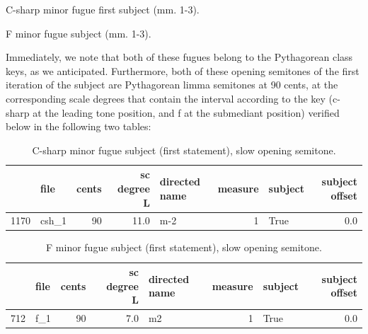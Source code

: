 \begin{Example}[H]
\vspace{1.5em}
    \centering
    \caption{ C-sharp minor fugue first subject (mm. 1-3). }
\end{Example}    


\begin{Example}[H]
\vspace{1.5em}
    \centering
    \caption{ F minor fugue subject (mm. 1-3). }
\end{Example}    
    Immediately, we note that both of these fugues belong to the Pythagorean
class keys, as we anticipated. Furthermore, both of these opening
semitones of the first iteration of the subject are Pythagorean limma
semitones at 90 cents, at the corresponding scale degrees that contain
the interval according to the key (c-sharp at the leading tone position,
and f at the submediant position) verified below in the following two
tables:

\begin{singlespace}
\begin{table}[H]
\centering
\tiny
\begin{tabular}{|llrrlrlr|}
\hline
\textbf{{}} & \textbf{  file} & \textbf{ cents} & \textbf{ sc degree L} & \textbf{directed name} & \textbf{ measure} & \textbf{subject} & \textbf{ subject offset }\\
\hline
1170 &  csh\_1 &     90 &         11.0 &           m-2 &        1 &    True &             0.0 \\
\hline
\end{tabular}
\caption{C-sharp minor fugue subject (first statement), slow opening semitone. }
\end{table}
\normalsize
\end{singlespace}

\begin{singlespace}
\begin{table}[H]
\centering
\tiny
\begin{tabular}{|llrrlrlr|}
\hline
\textbf{{}} & \textbf{file} & \textbf{ cents} & \textbf{ sc degree L} & \textbf{directed name} & \textbf{ measure} & \textbf{subject} & \textbf{ subject offset }\\
\hline
712 &  f\_1 &     90 &          7.0 &            m2 &        1 &    True &             0.0 \\
\hline
\end{tabular}
\caption{F minor fugue subject (first statement), slow opening semitone. }
\end{table}
\normalsize
\end{singlespace}

